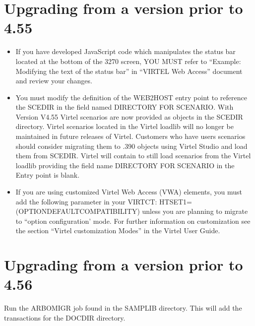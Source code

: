 \documentclass[letterpaper,10pt,english]{sphinxmanual}
\begin{document}
\section{Upgrading from a version prior to 4.55}
\label{\detokenize{Migration_Guide:upgrading-from-a-version-prior-to-4-55}}\label{\detokenize{Migration_Guide:index-5}}\begin{itemize}
\item {} 
\sphinxAtStartPar
If you have developed JavaScript code which manipulates the status bar located at the bottom of the 3270 screen, YOU MUST refer to “Example: Modifying the text of the status bar” in “VIRTEL Web Access” document and review your changes.

\item {} 
\sphinxAtStartPar
You must modify the definition of the WEB2HOST entry point to reference the SCE\sphinxhyphen{}DIR in the field named DIRECTORY FOR SCENARIO. With Version V4.55 Virtel scenarios are now provided as objects in the SCE\sphinxhyphen{}DIR directory. Virtel scenarios located in the Virtel loadlib will no longer be maintained in future releases of Virtel. Customers who have users scenarios should consider migrating them to .390 objects using Virtel Studio and load them from SCE\sphinxhyphen{}DIR. Virtel will contain to still load scenarios from the Virtel loadlib providing the field name DIRECTORY FOR SCENARIO in the Entry point is blank.

\item {} 
\sphinxAtStartPar
If you are using customized Virtel Web Access (VWA) elements, you must add the following parameter in your VIRTCT: HTSET1=(OPTION\sphinxhyphen{}DEFAULT\sphinxhyphen{}COMPATIBILITY) unless you are planning to migrate to “option configuration’ mode. For further information on customization see the section “Virtel customization Modes” in the Virtel User Guide.

\end{itemize}

\ignorespaces 

\section{Upgrading from a version prior to 4.56}
\label{\detokenize{Migration_Guide:upgrading-from-a-version-prior-to-4-56}}\label{\detokenize{Migration_Guide:index-6}}
\sphinxAtStartPar
Run the ARBOMIGR job found in the SAMPLIB directory. This will add the transactions for the DOC\sphinxhyphen{}DIR directory.
\end{document}

